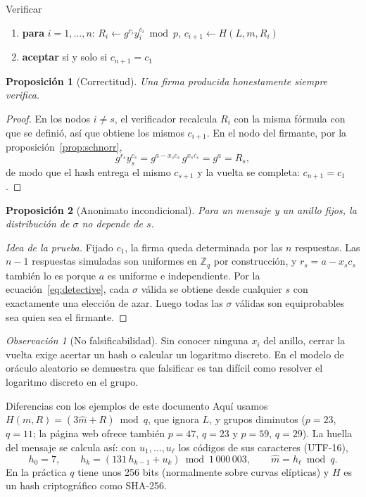 \documentclass[11pt,a4paper]{article}
\theoremstyle{definition}
\theoremstyle{plain}
\newtheorem{proposicion}{Proposición}
\theoremstyle{remark}
\newtheorem*{observacion}{Observación}
\newcommand{\Zq}{\mathbb{Z}_q}
\newcommand{\mh}{\hat{m}}
\begin{document}
\begin{algoritmo}{Verificar}
\begin{enumerate}[leftmargin=1.6em,itemsep=0.15em,label=\arabic*:]
  \item \textbf{para} $i = 1, \dots, n$: \quad $R_i \gets g^{r_i} y_i^{c_i} \bmod p$,
        \quad $c_{i+1} \gets H(L, m, R_i)$
  \item \textbf{aceptar} si y solo si $c_{n+1} = c_1$
\end{enumerate}
\end{algoritmo}

\begin{proposicion}[Correctitud]\label{prop:correcta}
Una firma producida honestamente siempre verifica.
\end{proposicion}
\begin{proof}
En los nodos $i \neq s$, el verificador recalcula $R_i$ con la misma fórmula con que
se definió, así que obtiene los mismos $c_{i+1}$. En el nodo del firmante, por la
proposición~\ref{prop:schnorr},
\[
  g^{r_s} y_s^{c_s} = g^{a - x_s c_s}\, g^{x_s c_s} = g^{a} = R_s ,
\]
de modo que el hash entrega el mismo $c_{s+1}$ y la vuelta se completa:
$c_{n+1} = c_1$.
\end{proof}

\begin{proposicion}[Anonimato incondicional]\label{prop:anonimato}
Para un mensaje y un anillo fijos, la distribución de $\sigma$ no depende de $s$.
\end{proposicion}
\begin{proof}[Idea de la prueba]
Fijado $c_1$, la firma queda determinada por las $n$ respuestas. Las $n-1$
respuestas simuladas son uniformes en $\Zq$ por construcción, y $r_s = a - x_s c_s$
también lo es porque $a$ es uniforme e independiente. Por la
ecuación~\eqref{eq:detective}, cada $\sigma$ válida se obtiene desde cualquier $s$
con exactamente una elección de azar. Luego todas las $\sigma$ válidas son
equiprobables sea quien sea el firmante.
\end{proof}

\begin{observacion}[No falsificabilidad]
Sin conocer ninguna $x_i$ del anillo, cerrar la vuelta exige acertar un hash o
calcular un logaritmo discreto. En el modelo de oráculo aleatorio se demuestra que
falsificar es tan difícil como resolver el logaritmo discreto en el grupo.
\end{observacion}

\begin{caso}{Diferencias con los ejemplos de este documento}
Aquí usamos $H(m,R) = (3\mh + R) \bmod q$, que ignora $L$, y grupos diminutos
($p = 23$, $q = 11$; la página web ofrece también $p = 47$, $q = 23$ y $p = 59$,
$q = 29$). La huella del mensaje se calcula así: con $u_1,\dots,u_\ell$ los códigos
de sus caracteres (UTF-16),
\[
  h_0 = 7,\qquad h_k = (131\, h_{k-1} + u_k) \bmod 1\,000\,003,\qquad \mh = h_\ell \bmod q .
\]
En la práctica $q$ tiene unos 256 bits (normalmente sobre curvas elípticas) y $H$ es
un hash criptográfico como SHA-256.
\end{caso}
\end{document}

